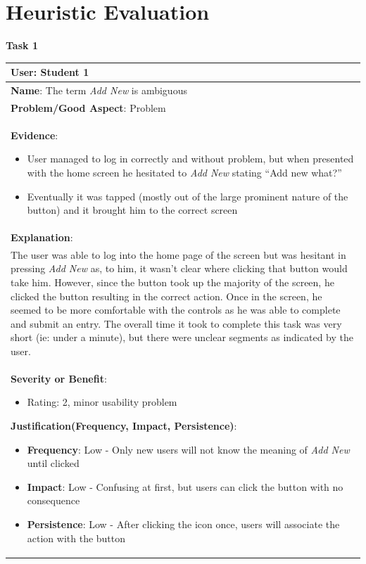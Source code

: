 \documentclass[pdftex,12pt,a4paper]{report}
\begin{document}
\section*{Heuristic Evaluation}
\textbf{Task 1}
\begin{center}
	\begin{tabular}{|p{\textwidth}|}
	\hline
	\textbf{User}: Student 1\\
	\hline
	\textbf{Name}: The term \emph{Add New} is ambiguous\\
	\hline
	\textbf{Problem/Good Aspect}: Problem\\
	\hline
	\textbf{Evidence}:
	\begin{itemize}
	\item{User managed to log in correctly and without problem, but when presented with the home screen he hesitated to \emph{Add New} stating ``Add new what?''}
	\item{Eventually it was tapped (mostly out of the large prominent nature of the button) and it brought him to the correct screen}
	\end{itemize}\\
	\hline
	\textbf{Explanation}:\\
	The user was able to log into the home page of the screen but was hesitant in pressing \emph{Add New} as, to him, it wasn't clear where clicking that button would take him. However, since the button took up the majority of the screen, he clicked the button resulting in the correct action. Once in the screen, he seemed to be more comfortable with the controls as he was able to complete and submit an entry. The overall time it took to complete this task was very short (ie: under a minute), but there were unclear segments as indicated by the user.\\
	\hline
	\textbf{Severity or Benefit}:
	\begin{itemize}
	\item{Rating: 2, minor usability problem}
	\end{itemize}
	\textbf{Justification(Frequency, Impact, Persistence)}:
	\begin{itemize}
	\item{\textbf{Frequency}:} Low - Only new users will not know the meaning of \emph{Add New} until clicked
	\item{\textbf{Impact}:} Low - Confusing at first, but users can click the button with no consequence
	\item{\textbf{Persistence}:} Low - After clicking the icon once, users will associate the action with the button

\end{itemize}
\end{tabular}
\end{center}
\end{document}
